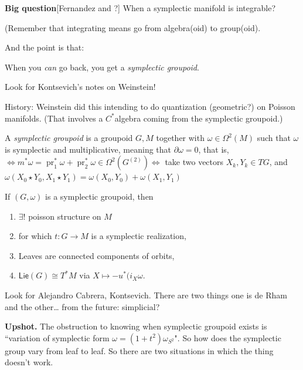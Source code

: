 \medskip\noindent
{\bf Big question}[Fernandez and ?]
When a symplectic manifold is integrable?


(Remember that integrating means go from
algebra(oid) to group(oid).

And the point is that:

\medskip\noindent
When you {\it can} go back, you get a
\textit{ symplectic groupoid}.

\begin{remark}
Look for Kontsevich's notes on Weinstein!
\end{remark}

\begin{remark}
History: Weinstein did this intending to do
quantization (geometric?) on Poisson
manifolds. (That involves a \(C^*\)algebra
coming from the symplectic groupoid.)
\end{remark}

\begin{definition}
A {\it symplectic groupoid} is a groupoid
\(G, M\) together with  \(\omega \in
\Omega^2(M)\) such that \(\omega\) is
symplectic and multiplicative, meaning that
\(\partial  \omega =0\), that is, \(\iff
m^*\omega=\operatorname{pr}_1^*\omega+
\operatorname{pr}^*_2\omega\in
\Omega^{2}(G^{(2)})\iff\) take two vectors \(
X_k,Y_k \in TG\), and \(\omega(X_0 \star
Y_0,X_1\star Y_1) =  \omega(X_0,Y_0) + \omega
(X_1,Y_1)\)
\end{definition}

\begin{theorem}
If \((G, \omega)\) is a symplectic groupoid,
then
\begin{enumerate}
\item \(\exists !\) poisson structure on
\(M\)
\item for which \(t: G \to M\) is a
symplectic realization,
\item  Leaves are connected components of
orbits,
\item \(\mathsf{Lie}(G)\cong T^*M\) via \(X
\mapsto -u ^*(i_X \omega\).
\end{enumerate}
\end{theorem}

\begin{remark}
Look for Alejandro Cabrera, Kontsevich. There
are two things one is de Rham and the other…
from the future: simplicial?
\end{remark}

\medskip\noindent
{\bf Upshot.} The obstruction to knowing when
symplectic groupoid exists is ``variation of
symplectic form \(\omega=(1+t^2)
\omega_{S^2}\)". So how does the symplectic
group vary from leaf to leaf. So there are
two situations in which the thing doesn't
work.



